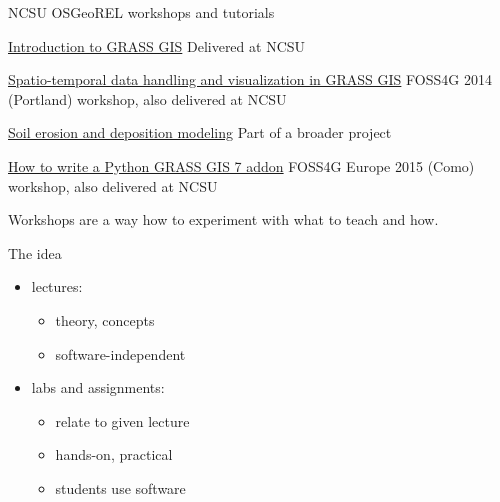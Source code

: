 \documentclass[xcolor={dvipsnames,usenames},beamer]{beamer}
\begin{document}
\begin{frame}{NCSU OSGeoREL workshops and tutorials}

\begin{block}{\href{http://ncsu-osgeorel.github.io/grass-intro-workshop/}%
  {Introduction to GRASS GIS}}
  \footnotesize
  Delivered at NCSU
\end{block}

\begin{block}{\href{http://ncsu-osgeorel.github.io/grass-temporal-workshop/}%
  {Spatio-temporal data handling and visualization in GRASS GIS}}
  \footnotesize
  FOSS4G 2014 (Portland) workshop, also delivered at NCSU
\end{block}


\begin{block}{\href{http://ncsu-osgeorel.github.io/erosion-modeling-tutorial/}%
  {Soil erosion and deposition modeling}}
  \footnotesize
  Part of a broader project
\end{block}


\begin{block}{\href{https://github.com/wenzeslaus/python-grass-addon}%
  {How to write a Python GRASS GIS 7 addon}}
  \footnotesize
  FOSS4G Europe 2015 (Como) workshop, also delivered at NCSU
\end{block}

\bigskip
\footnotesize
Workshops are a way how to experiment with what to teach and how.

\end{frame}


\begin{frame}{The idea}

\begin{itemize}
 \item lectures:
 \begin{itemize}
  \item theory, concepts
  \item software-independent
 \end{itemize}
 \item labs and assignments:
 \begin{itemize}
  \item relate to given lecture
  \item hands-on, practical
  \item students use software
 \end{itemize}
\end{itemize}

\end{frame}
\end{document}
